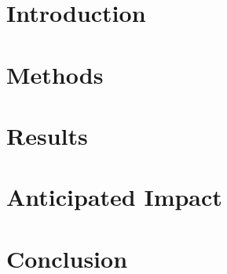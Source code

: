 \documentclass[12pt]{article}
\begin{document}
\maketitle

\begin{abstract}

\end{abstract}

\section{Introduction}


\section{Methods}


\section{Results}


\section{Anticipated Impact}


\section{Conclusion}




\end{document}
